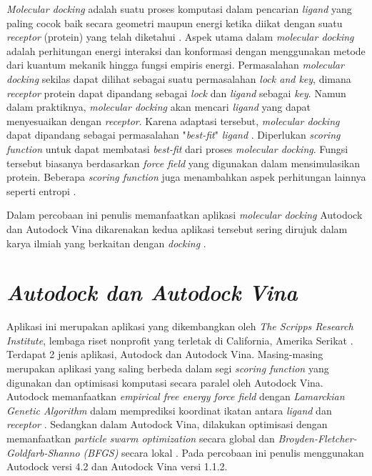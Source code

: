 \textit{Molecular docking} adalah suatu proses komputasi dalam pencarian \textit{ligand} yang paling cocok baik secara geometri maupun energi ketika diikat dengan suatu \textit{receptor} (protein) yang telah diketahui \cite{MolecularDocking}. Aspek utama dalam \textit{molecular docking} adalah perhitungan energi interaksi dan konformasi dengan menggunakan metode dari kuantum mekanik hingga fungsi empiris energi. Permasalahan \textit{molecular docking} sekilas dapat dilihat sebagai suatu permasalahan \textit{lock and key}, dimana \textit{receptor} protein dapat dipandang sebagai \textit{lock} dan \textit{ligand} sebagai \textit{key}. Namun dalam praktiknya, \textit{molecular docking} akan mencari \textit{ligand} yang dapat menyesuaikan dengan \textit{receptor}. Karena adaptasi tersebut, \textit{molecular docking} dapat dipandang sebagai permasalahan "\textit{best-fit}" \textit{ligand} \cite{best-fit}. Diperlukan \textit{scoring function} untuk dapat membatasi \textit{best-fit} dari proses \textit{molecular docking}. Fungsi tersebut biasanya berdasarkan \textit{force field} yang digunakan dalam mensimulasikan protein. Beberapa \textit{scoring function} juga menambahkan aspek perhitungan lainnya seperti entropi \cite{MolecularDocking}.

Dalam percobaan ini penulis memanfaatkan aplikasi \textit{molecular docking} Autodock dan Autodock Vina dikarenakan kedua aplikasi tersebut sering dirujuk dalam karya ilmiah yang berkaitan dengan \textit{docking} \cite{autodock most cited}.

\section{\textit{Autodock dan Autodock Vina}}
\hspace{0.5cm}Aplikasi ini merupakan aplikasi yang dikembangkan oleh \textit{The Scripps Research Institute}, lembaga riset nonprofit yang terletak di California, Amerika Serikat \cite{website resmi}. Terdapat 2 jenis aplikasi, Autodock dan Autodock Vina. Masing-masing merupakan aplikasi yang saling berbeda dalam segi \textit{scoring function} yang digunakan dan optimisasi komputasi secara paralel oleh Autodock Vina. Autodock memanfaatkan \textit{empirical free energy force field} dengan \textit{Lamarckian Genetic Algorithm} dalam  memprediksi koordinat ikatan antara \textit{ligand} dan \textit{receptor} \cite{autodock}. Sedangkan dalam Autodock Vina, dilakukan optimisasi dengan memanfaatkan \textit{particle swarm optimization} secara global dan \textit{Broyden-Fletcher-Goldfarb-Shanno (BFGS)} secara lokal \cite{autodockvina}. Pada percobaan ini penulis menggunakan Autodock versi 4.2 dan Autodock Vina versi 1.1.2.

